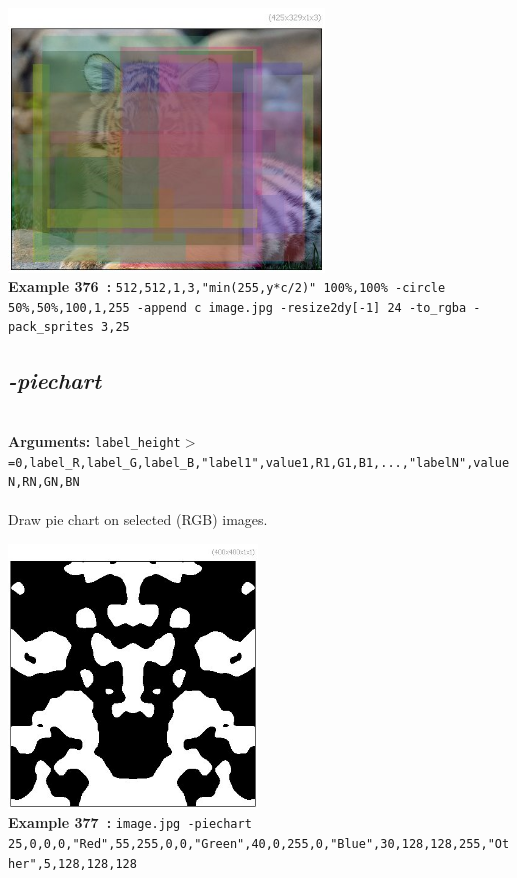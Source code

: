 \documentclass[a4paper,11pt,twoside]{book}
\begin{document}
\begin{center}\includegraphics[keepaspectratio=true,height=7cm,width=\textwidth]{img/gmic_def376.jpg}\\
{\footnotesize \textbf{Example 376~:} \texttt{512,512,1,3,"min(255,y*c/2)" 100\%,100\% -circle 50\%,50\%,100,1,255 -append c image.jpg -resize2dy[-1] 24 -to\_rgba -pack\_sprites 3,25}}
\end{center}

\subsection{\emph{-piechart} }\vspace*{-0.5em}
~\\\textbf{Arguments: } 
{\small \texttt{label\_height$>$=0,label\_R,label\_G,label\_B,"label1",value1,R1,G1,B1,...,"labelN",valueN,RN,GN,BN}}\\~\\
Draw pie chart on selected (RGB) images.
\begin{center}\includegraphics[keepaspectratio=true,height=7cm,width=\textwidth]{img/gmic_def377.jpg}\\
{\footnotesize \textbf{Example 377~:} \texttt{image.jpg -piechart 25,0,0,0,"Red",55,255,0,0,"Green",40,0,255,0,"Blue",30,128,128,255,"Other",5,128,128,128}}
\end{center}
\end{document}
